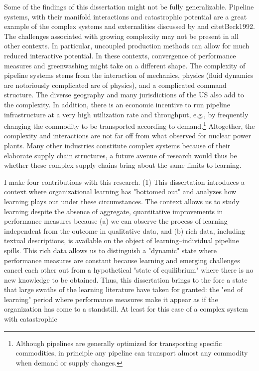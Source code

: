 Some of the findings of this dissertation might not be fully generalizable. Pipeline systems, with their manifold interactions and catastrophic potential are a great example of the complex systems and externalities discussed by \citet{Perrow1984} and citet{Beck1992}. The challenges associated with growing complexity may not be present in all other contexts. In particular, uncoupled production methods can allow for much reduced interactive potential. In these contexts, convergence of performance measures and greenwashing might take on a different shape. The complexity of pipeline systems stems from the interaction of mechanics, physics (fluid dynamics are notoriously complicated are of physics), and a complicated command structure. The diverse geography and many jurisdictions of the US also add to the complexity. In addition, there is an economic incentive to run pipeline infrastructure at a very high utilization rate and throughput, e.g., by frequently changing the commodity to be transported according to demand.\footnote{Although pipelines are generally optimized for transporting specific commodities, in principle any pipeline can transport almost any commodity when demand or supply changes.} Altogether, the complexity and interactions are not far off from what \citet{Perrow1984} observed for nuclear power plants. Many other industries constitute complex systems because of their elaborate supply chain structures, a future avenue of research would thus be whether these complex supply chains bring about the same limits to learning.

I make four contributions with this research. (1) This dissertation introduces a context where organizational learning has "bottomed out" and analyzes how learning plays out under these circumstances. The context allows us to study learning despite the absence of aggregate, quantitative improvements in performance measures because (a) we can observe the process of learning independent from the outcome in qualitative data, and (b) rich data, including textual descriptions, is available on the object of learning--individual pipeline spills. This rich data allows us to distinguish a "dynamic" state where performance measures are constant because learning and emerging challenges cancel each other out from a hypothetical "state of equilibrium" where there is no new knowledge to be obtained. Thus, this dissertation brings to the fore a state that large swaths of the learning literature have taken for granted: the "end of learning" period where performance measures make it appear as if the organization has come to a standstill. At least for this case of a complex system with catastrophic 

